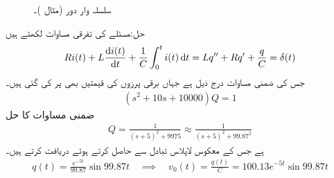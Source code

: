 \begin{figure}
\centering
\begin{subfigure}{0.45\textwidth}
\centering
{}
\end{subfigure} \hfill
\begin{subfigure}{0.45\textwidth}
\centering
{}
\end{subfigure} 
\caption{سلسلہ وار دور (مثال )۔}
\label{شکل_مثال_سلسلہ_وار_دور_اکائی_ضرب}
\end{figure}

حل:مسئلے کی تفرقی مساوات لکھتے ہیں
\begin{align*}
Ri(t)+L\frac{\dif i(t)}{\dif t}+\frac{1}{C}\int_{0}^{t} i(t)\dif t=Lq''+Rq'+\frac{q}{C}=\delta(t)
\end{align*}
جس کی ضمنی مساوات درج ذیل ہے جہاں برقی پرزوں کی قیمتیں بھی پر کی گئی ہیں۔
\begin{align*}
(s^2+10s+10000)Q=1
\end{align*}
ضمنی مساوات کا حل
\begin{align*}
Q=\frac{1}{(s+5)^2+9975}\approx \frac{1}{(s+5)^2+99.87^2}
\end{align*}
ہے جس کے معکوس لاپلاس تبادل سے  حاصل کرتے ہوئے  دریافت کرتے ہیں۔
\begin{align*}
q(t)=\frac{e^{-5t}}{99.87}\sin 99.87 t\quad \implies \quad v_0(t)=\frac{q(t)}{C}=100.13e^{-5t}\sin 99.87t
\end{align*}

